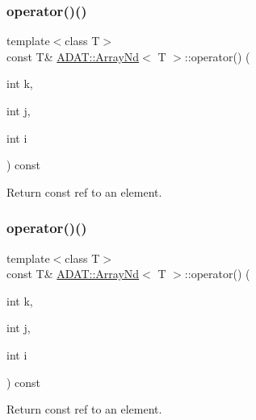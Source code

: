 \mbox{\label{classADAT_1_1ArrayNd_a1452ab01ffb2824ebcfa50ebbcdd7b8a}} 
\subsubsection{\texorpdfstring{operator()()}{operator()()}\hspace{0.1cm}{\footnotesize\ttfamily [11/16]}}
{\footnotesize\ttfamily template$<$class T$>$ \\
const T\& \mbox{\hyperlink{classADAT_1_1ArrayNd}{A\+D\+A\+T\+::\+Array\+Nd}}$<$ T $>$\+::operator() (\begin{DoxyParamCaption}\item[{int}]{k,  }\item[{int}]{j,  }\item[{int}]{i }\end{DoxyParamCaption}) const\hspace{0.3cm}{\ttfamily [inline]}}



Return const ref to an element. 

\mbox{\label{classADAT_1_1ArrayNd_a1452ab01ffb2824ebcfa50ebbcdd7b8a}} 
\subsubsection{\texorpdfstring{operator()()}{operator()()}\hspace{0.1cm}{\footnotesize\ttfamily [12/16]}}
{\footnotesize\ttfamily template$<$class T$>$ \\
const T\& \mbox{\hyperlink{classADAT_1_1ArrayNd}{A\+D\+A\+T\+::\+Array\+Nd}}$<$ T $>$\+::operator() (\begin{DoxyParamCaption}\item[{int}]{k,  }\item[{int}]{j,  }\item[{int}]{i }\end{DoxyParamCaption}) const\hspace{0.3cm}{\ttfamily [inline]}}



Return const ref to an element. 

